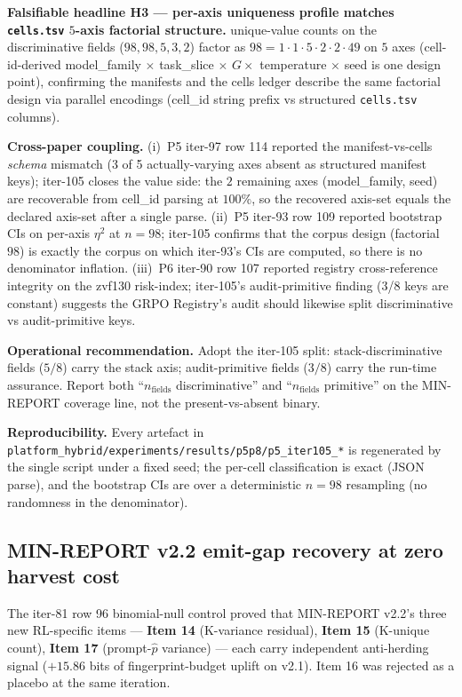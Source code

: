 \documentclass{article}  \usepackage[preprint,nonatbib]{neurips_2026} \usepackage[numbers]{natbib}
\begin{document}
\textbf{Falsifiable headline H3 --- per-axis uniqueness profile
matches \texttt{cells.tsv} $5$-axis factorial structure.}
unique-value counts on the discriminative fields ($98, 98, 5, 3, 2$)
factor as $98 = 1 \cdot 1 \cdot 5 \cdot 2 \cdot 2 \cdot 49$ on $5$
axes (cell-id-derived model\_family $\times$ task\_slice $\times$
$G \times$ temperature $\times$ seed is one design point), confirming
the manifests and the cells ledger describe the same factorial design
via parallel encodings (cell\_id string prefix vs structured
\texttt{cells.tsv} columns).

\textbf{Cross-paper coupling.} (i)~P5 iter-97 row 114 reported the
manifest-vs-cells \emph{schema} mismatch (3 of 5 actually-varying
axes absent as structured manifest keys); iter-105 closes the value
side: the $2$ remaining axes (model\_family, seed) are recoverable
from cell\_id parsing at $100\%$, so the recovered axis-set equals
the declared axis-set after a single parse. (ii)~P5 iter-93 row 109
reported bootstrap CIs on per-axis $\eta^{2}$ at $n{=}98$;
iter-105 confirms that the corpus design (factorial $98$) is exactly
the corpus on which iter-93's CIs are computed, so there is no
denominator inflation. (iii)~P6 iter-90 row 107 reported registry
cross-reference integrity on the zvf130 risk-index; iter-105's
audit-primitive finding (3/8 keys are constant) suggests the GRPO
Registry's audit should likewise split discriminative vs audit-primitive
keys.

\textbf{Operational recommendation.} Adopt the iter-105 split:
stack-discriminative fields ($5/8$) carry the stack axis; audit-primitive
fields ($3/8$) carry the run-time assurance. Report both
``$n_{\text{fields}}$ discriminative'' and ``$n_{\text{fields}}$
primitive'' on the MIN-REPORT coverage line, not the present-vs-absent
binary.

\textbf{Reproducibility.} Every artefact in
\texttt{platform_hybrid/experiments/results/p5p8/p5\_iter105\_*} is regenerated by the
single script under a fixed seed; the per-cell classification is exact
(JSON parse), and the bootstrap CIs are over a deterministic $n{=}98$
resampling (no randomness in the denominator).
 \subsection{MIN-REPORT v2.2 emit-gap recovery at zero harvest cost}
\label{sec:p5-iter113-v22-recovery}

The iter-81 row 96 binomial-null control proved that MIN-REPORT v2.2's
three new RL-specific items --- \textbf{Item 14} (K-variance residual),
\textbf{Item 15} (K-unique count), \textbf{Item 17} (prompt-$\hat p$
variance) --- each carry independent anti-herding signal ($+15.86$ bits
of fingerprint-budget uplift on v2.1). Item 16 was rejected as a placebo
at the same iteration.
\end{document}
